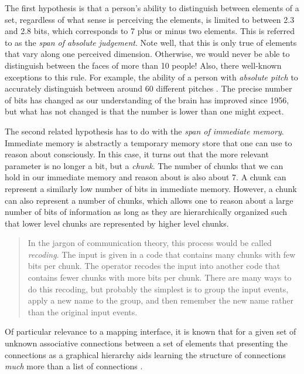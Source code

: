The first hypothesis is that a person's ability to distinguish between elements of a set, regardless of what sense is perceiving the elements, is limited to between 2.3 and 2.8 bits, which corresponds to 7 plus or minus two elements. This is referred to as the \emph{span of absolute judgement}. Note well, that this is only true of elements that vary along one perceived dimension. Otherwise, we would never be able to distinguish between the faces of more than 10 people! Also, there well-known exceptions to this rule. For example, the ability of a person with \emph{absolute pitch} to accurately distinguish between around 60 different pitches \cite{seven1956}. The precise number of bits has changed as our understanding of the brain has improved since 1956, but what has not changed is that the number is lower than one might expect. 

The second related hypothesis has to do with the \emph{span of immediate memory}. Immediate memory is abstractly a temporary memory store that one can use to reason about consciously. In this case, it turns out that the more relevant parameter is no longer a bit, but a \emph{chunk}. The number of chunks that we can hold in our immediate memory and reason about is also about 7. A chunk can represent a similarly low number of bits in immediate memory. However, a chunk can also represent a number of chunks, which allows one to reason about a large number of bits of information as long as they are hierarchically organized such that lower level chunks are represented by higher level chunks.

\begin{quote}
In the jargon of communication theory, this process would be called \emph{recoding}. The input is given in a code that contains many chunks with few bits per chunk. The operator recodes the input into another code that contains fewer chunks with more bits per chunk. There are many ways to do this recoding, but probably the simplest is to group the input events, apply a new name to the group, and then remember the new name rather than the original input events. \cite{seven1956}
\end{quote}

Of particular relevance to a mapping interface, it is known that for a given set of unknown associative connections between a set of elements that presenting the connections as a graphical hierarchy aids learning the structure of connections \emph{much} more than a list of connections \cite{graphicalhierarchy1972}. 

